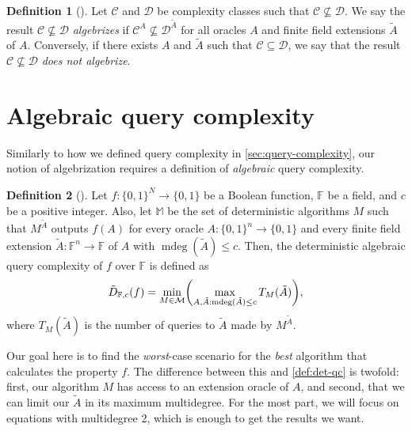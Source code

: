 \documentclass[english,12pt]{reedthesis}
\theoremstyle{plain}
\theoremstyle{definition}
\newtheorem{defn}[defn]{Definition}
\theoremstyle{remark}
\DeclareMathOperator{\mdeg}{mdeg}
\begin{document}
\begin{defn}[{\cite[Def.\ 2.3]{AW09}}]\label{def:algebrization-neq}
  Let $\mathcal{C}$ and $\mathcal{D}$ be complexity classes such that $\mathcal{C} \nsubseteq \mathcal{D}$. We say the result
  $\mathcal{C} \nsubseteq \mathcal{D}$ \emph{algebrizes} if $\mathcal{C}^{A} \nsubseteq \mathcal{D}^{\tilde{A}}$ for all oracles $A$ and
  finite field extensions $\tilde{A}$ of $A$. Conversely, if there exists $A$
  and $\tilde{A}$ such that $\mathcal{C} \subseteq \mathcal{D}$, we say that the result $\mathcal{C} \nsubseteq \mathcal{D}$ \emph{does
    not algebrize}.
\end{defn}

\section{Algebraic query complexity}\label{sec:alg-query-complexity}

Similarly to how we defined query complexity in \cref{sec:query-complexity}, our
notion of algebrization requires a definition of \emph{algebraic} query
complexity. %

\begin{defn}[{\cite[Def. 4.1]{AW09}}]\label{def:aqc}
  Let $f: \{0, 1\}^{N} \rightarrow \{0, 1\}$ be a Boolean function, $\mathbb{F}$ be a
  field, and $c$ be a positive integer. Also, let $\mathbb{M}$ be the set of
  deterministic algorithms $M$ such that $M^{\tilde{A}}$ outputs $f(A)$ for
  every oracle $A: \{0, 1\}^{n} \rightarrow \{0, 1\}$ and every finite field extension
  $\tilde{A}: \mathbb{F}^{n} \rightarrow \mathbb{F}$ of $A$ with $\mdeg(\tilde{A}) \le c$.
  Then, the deterministic algebraic query complexity of $f$ over $\mathbb{F}$ is
  defined as
  \begin{equation}
    \tilde{D}_{\mathbb{F}, c}(f) = \min_{M \in \mathcal{M}}\mleft(
      \max_{A, \tilde{A}: \mdeg(\tilde{A}) \le c}T_{M}(\tilde{A})
    \mright),
  \end{equation}
  where $T_{M}(\tilde{A})$ is the number of queries to $\tilde{A}$ made by
  $M^{\tilde{A}}$.
\end{defn}

Our goal here is to find the \emph{worst}-case scenario for the \emph{best}
algorithm that calculates the property $f$. The difference between this and
\cref{def:det-qc} is twofold: first, our algorithm $M$ has access to
an extension oracle of $A$, and second, that we can limit our $\tilde{A}$ in
its maximum multidegree. For the most part, we will focus on equations with
multidegree 2, which is enough to get the results we want.
\end{document}
